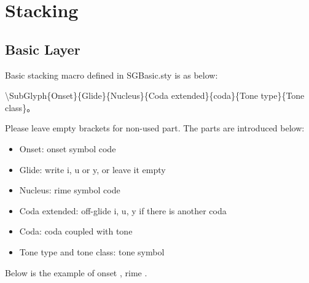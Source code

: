 \section{Stacking}
\subsection{Basic Layer}
Basic stacking macro defined in SGBasic.sty is as below: \par
{\textbackslash}SubGlyph\{Onset\}\{Glide\}{\{}Nucleus{\}}\{Coda extended\}\{coda\}{\{}Tone type{\}}{\{}Tone class{\}}。\par
Please leave empty brackets for non-used part. The parts are introduced below: \par
\begin{itemize}
	\item Onset: onset symbol code
	\item Glide: write i, u or y, or leave it empty
	\item Nucleus: rime symbol code
	\item Coda extended: off-glide i, u, y if there is another coda
	\item Coda: coda coupled with tone
	\item Tone type and tone class: tone symbol
\end{itemize}
Below is the example of onset , rime . \par
%

